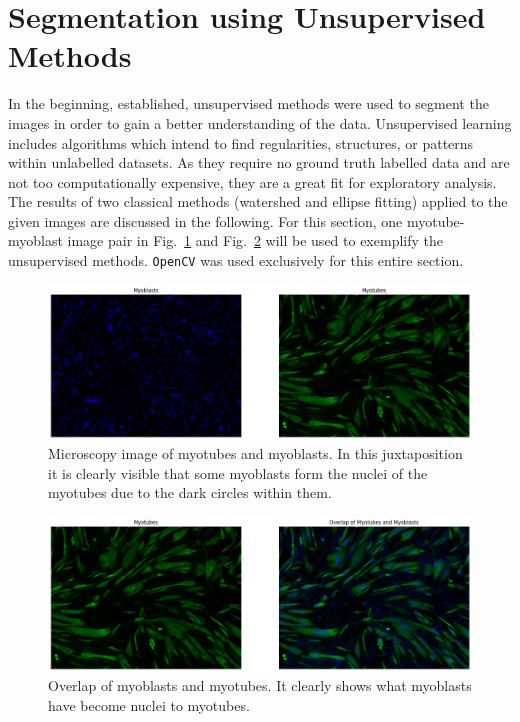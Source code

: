 \section{Segmentation using Unsupervised Methods}\label{secunsupervised}
In the beginning, established, unsupervised methods were used to segment the images in order to gain a better understanding of the data. Unsupervised learning includes algorithms which intend to find regularities, structures, or patterns within unlabelled datasets. As they require no ground truth labelled data and are not too computationally expensive, they are a great fit for exploratory analysis. The results of two classical methods (watershed and ellipse fitting) applied to the given images are discussed in the following. For this section, one myotube-myoblast image pair in Fig.~\ref{figtubeblast} and Fig.~\ref{figoverlap} will be used to exemplify the unsupervised methods. \texttt{OpenCV} \cite{opencv_library} was used exclusively for this entire section.
\begin{figure}
	\centering
	\includegraphics[width=\textwidth]{"images/workhorse.png"}
	\caption[Workhorse image of myoblasts and myotubes]{Microscopy image of myotubes and myoblasts. In this juxtaposition it is clearly visible that some myoblasts form the nuclei of the myotubes due to the dark circles within them.}
	\label{figtubeblast}
\end{figure}

\begin{figure}
	\centering
	\includegraphics[width=\textwidth]{"images/overlap.png"}
	\caption[Overlap of myoblasts and myotubes]{Overlap of myoblasts and myotubes. It clearly shows what myoblasts have become nuclei to myotubes.}
	\label{figoverlap}
\end{figure}

